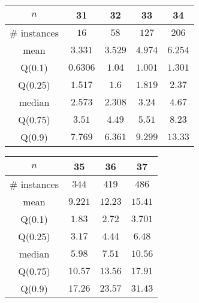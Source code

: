 \begin{tabular}{c|cccc} 
\hline 
$n$ & 31 & 32 & 33 & 34 \tabularnewline 
\hline 
\hline 
\# instances & $16$ & $58$ & $127$ & $206$ \tabularnewline 
mean & $3.331$ & $3.529$ & $4.974$ & $6.254$ \tabularnewline 
Q(0.1) & $0.6306$ & $1.04$ & $1.001$ & $1.301$ \tabularnewline 
Q(0.25) & $1.517$ & $1.6$ & $1.819$ & $2.37$ \tabularnewline 
median & $2.573$ & $2.308$ & $3.24$ & $4.67$ \tabularnewline 
Q(0.75) & $3.51$ & $4.49$ & $5.51$ & $8.23$ \tabularnewline 
Q(0.9) & $7.769$ & $6.361$ & $9.299$ & $13.33$ \tabularnewline 
\hline 
\end{tabular} 
\medskip{} 

\begin{tabular}{c|ccc} 
\hline 
$n$ & 35 & 36 & 37 \tabularnewline 
\hline 
\hline 
\# instances & $344$ & $419$ & $486$ \tabularnewline 
mean & $9.221$ & $12.23$ & $15.41$ \tabularnewline 
Q(0.1) & $1.83$ & $2.72$ & $3.701$ \tabularnewline 
Q(0.25) & $3.17$ & $4.44$ & $6.48$ \tabularnewline 
median & $5.98$ & $7.51$ & $10.56$ \tabularnewline 
Q(0.75) & $10.57$ & $13.56$ & $17.91$ \tabularnewline 
Q(0.9) & $17.26$ & $23.57$ & $31.43$ \tabularnewline 
\hline 
\end{tabular} 
\medskip{} 

